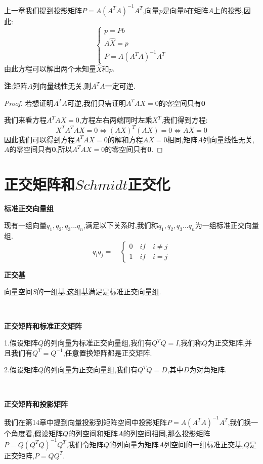 \documentclass[oneside]{book}
\begin{document}
上一章我们提到投影矩阵$P=A(A^{T}A)^{-1}A^{T}$,向量$p$是向量$b$在矩阵$A$上的投影,因此:
\begin{equation}\left\{\begin{array}{c}
	p=Pb\\A\hat{X}=p\\P=A(A^{T}A)^{-1}A^{T}
\end{array}\right.\end{equation}
由此方程可以解出两个未知量$\hat{X}$和$p$.

\textbf{注}:矩阵$A$列向量线性无关,则$A^{T}A$一定可逆.
\begin{proof}
	若想证明$A^{T}A$可逆,我们只需证明$A^{T}AX=0$的零空间只有\textbf{0}
	
	我们来看方程$A^{T}AX=0$,方程左右两端同时左乘$X^{T}$,我们得到方程:
	$$X^{T}A^{T}AX=0\Leftrightarrow (AX)^{T}(AX)=0\Leftrightarrow AX=0$$
	因此我们可以得到方程$A^{T}AX=0$的解和方程$AX=0$相同,矩阵$A$列向量线性无关,$A$的零空间只有\textbf{0},所以$A^{T}AX=0$的零空间只有\textbf{0}.
\end{proof}	 
	\chapter{正交矩阵和$Schmidt$正交化}
	\textbf{标准正交向量组}
	
	现有一组向量$q_{1},q_{2},q_{3}...q_{n}$,满足以下关系时,我们称$q_{1},q_{2},q_{3}...q_{n}$为一组标准正交向量组.
	$$q_{i}q_{j}=\quad \left\{\begin{array}{c}
		0 \quad if\quad  i\neq j\\1\quad if\quad  i=j
	\end{array}\right.$$

	\textbf{正交基}
	
	向量空间$S$的一组基,这组基满足是标准正交向量组.
	
	\hspace{\fill}\
	
	\textbf{正交矩阵和标准正交矩阵}
	
	1.假设矩阵$Q$的列向量为标准正交向量组,我们有$Q^{T}Q=I$,我们称$Q$为正交矩阵,并且我们有$Q^{T}=Q^{-1}$,任意置换矩阵都是正交矩阵.
	
	2.假设矩阵$Q$的列向量为正交向量组,我们有$Q^{T}Q=D$,其中$D$为对角矩阵.
	
	\hspace{\fill}\
	
	\textbf{正交矩阵和投影矩阵}
	
	我们在第14章中提到向量投影到矩阵空间中投影矩阵$P=A(A^{T}A)^{-1}A^{T}$,我们换一个角度看,假设矩阵$Q$的列空间和矩阵$A$的列空间相同,那么投影矩阵$P=Q(Q^{T}Q)^{-1}Q^{T}$,我们令矩阵$Q$的列向量为矩阵$A$列空间的一组标准正交基,$Q$是正交矩阵,$P=QQ^{T}$.
	
\end{document}
